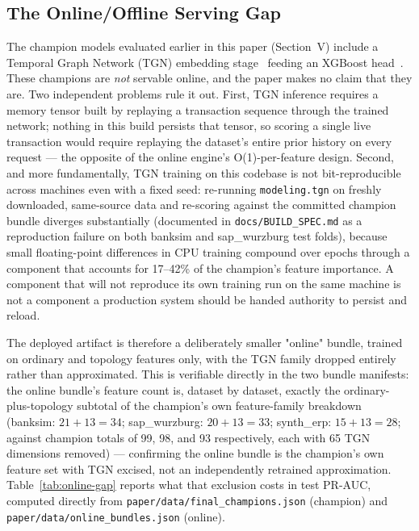 \subsection{The Online/Offline Serving Gap}\label{sec:system-serving}

The champion models evaluated earlier in this paper (Section~V) include a Temporal Graph Network (TGN) embedding stage~\cite{rossi2020temporal} feeding an XGBoost head~\cite{chen2016xgboost}. These champions are \emph{not} servable online, and the paper makes no claim that they are. Two independent problems rule it out. First, TGN inference requires a memory tensor built by replaying a transaction sequence through the trained network; nothing in this build persists that tensor, so scoring a single live transaction would require replaying the dataset's entire prior history on every request — the opposite of the online engine's O(1)-per-feature design. Second, and more fundamentally, TGN training on this codebase is not bit-reproducible across machines even with a fixed seed: re-running \texttt{modeling.tgn} on freshly downloaded, same-source data and re-scoring against the committed champion bundle diverges substantially (documented in \texttt{docs/BUILD\_SPEC.md} as a reproduction failure on both banksim and sap\_wurzburg test folds), because small floating-point differences in CPU training compound over epochs through a component that accounts for 17--42\% of the champion's feature importance. A component that will not reproduce its own training run on the same machine is not a component a production system should be handed authority to persist and reload.

The deployed artifact is therefore a deliberately smaller "online" bundle, trained on ordinary and topology features only, with the TGN family dropped entirely rather than approximated. This is verifiable directly in the two bundle manifests: the online bundle's feature count is, dataset by dataset, exactly the ordinary-plus-topology subtotal of the champion's own feature-family breakdown (banksim: $21+13=34$; sap\_wurzburg: $20+13=33$; synth\_erp: $15+13=28$; against champion totals of 99, 98, and 93 respectively, each with 65 TGN dimensions removed) — confirming the online bundle is the champion's own feature set with TGN excised, not an independently retrained approximation. Table~\ref{tab:online-gap} reports what that exclusion costs in test PR-AUC, computed directly from \texttt{paper/data/final\_champions.json} (champion) and \texttt{paper/data/online\_bundles.json} (online).

